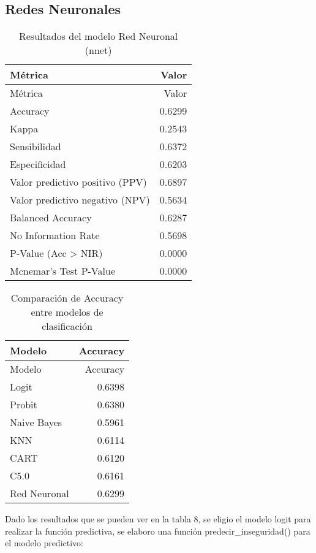 \documentclass[Royal,times,sageh]{sagej}
\begin{document}
\subsection{Redes Neuronales}\label{redes-neuronales}

\begin{longtable}[]{@{}lr@{}}
\caption{Resultados del modelo Red Neuronal (nnet)}\tabularnewline
\toprule\noalign{}
Métrica & Valor \\
\midrule\noalign{}
\endfirsthead
\toprule\noalign{}
Métrica & Valor \\
\midrule\noalign{}
\endhead
\bottomrule\noalign{}
\endlastfoot
Accuracy & 0.6299 \\
Kappa & 0.2543 \\
Sensibilidad & 0.6372 \\
Especificidad & 0.6203 \\
Valor predictivo positivo (PPV) & 0.6897 \\
Valor predictivo negativo (NPV) & 0.5634 \\
Balanced Accuracy & 0.6287 \\
No Information Rate & 0.5698 \\
P-Value (Acc \textgreater{} NIR) & 0.0000 \\
Mcnemar's Test P-Value & 0.0000 \\
\end{longtable}

\begin{longtable}[]{@{}lr@{}}
\caption{Comparación de Accuracy entre modelos de
clasificación}\tabularnewline
\toprule\noalign{}
Modelo & Accuracy \\
\midrule\noalign{}
\endfirsthead
\toprule\noalign{}
Modelo & Accuracy \\
\midrule\noalign{}
\endhead
\bottomrule\noalign{}
\endlastfoot
Logit & 0.6398 \\
Probit & 0.6380 \\
Naive Bayes & 0.5961 \\
KNN & 0.6114 \\
CART & 0.6120 \\
C5.0 & 0.6161 \\
Red Neuronal & 0.6299 \\
\end{longtable}

Dado los resultados que se pueden ver en la tabla 8, se eligio el modelo
logit para realizar la función predictiva, se elaboro una función
predecir\_inseguridad() para el modelo predictivo:
\end{document}
